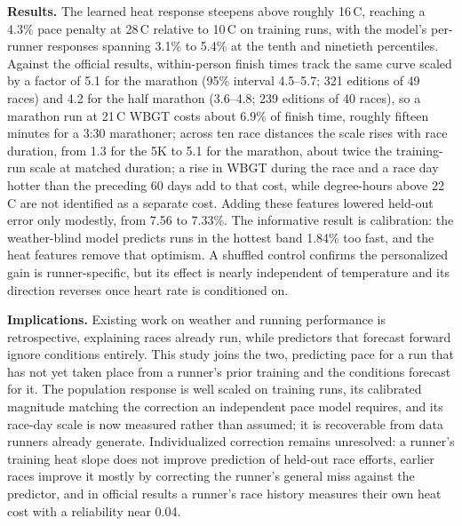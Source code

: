 \documentclass[11pt]{article}
\renewcommand{\_}{\textunderscore\allowbreak}
\begin{document}
\begin{singlespace}
\smallskip
\noindent\textbf{Results.} The learned heat response steepens above roughly 16\,\textdegree C, reaching a 4.3\% pace penalty at 28\,\textdegree C relative to 10\,\textdegree C on training runs, with the model's per-runner responses spanning 3.1\% to 5.4\% at the tenth and ninetieth percentiles. Against the official results, within-person finish times track the same curve scaled by a factor of 5.1 for the marathon (95\% interval 4.5--5.7; 321 editions of 49 races) and 4.2 for the half marathon (3.6--4.8; 239 editions of 40 races), so a marathon run at 21\,\textdegree C WBGT costs about 6.9\% of finish time, roughly fifteen minutes for a 3:30 marathoner; across ten race distances the scale rises with race duration, from 1.3 for the 5K to 5.1 for the marathon, about twice the training-run scale at matched duration; a rise in WBGT during the race and a race day hotter than the preceding 60 days add to that cost, while degree-hours above 22\,\textdegree C are not identified as a separate cost. Adding these features lowered held-out error only modestly, from 7.56 to 7.33\%. The informative result is calibration: the weather-blind model predicts runs in the hottest band 1.84\% too fast, and the heat features remove that optimism. A shuffled control confirms the personalized gain is runner-specific, but its effect is nearly independent of temperature and its direction reverses once heart rate is conditioned on.

\smallskip
\noindent\textbf{Implications.} Existing work on weather and running performance is retrospective, explaining races already run, while predictors that forecast forward ignore conditions entirely. This study joins the two, predicting pace for a run that has not yet taken place from a runner's prior training and the conditions forecast for it. The population response is well scaled on training runs, its calibrated magnitude matching the correction an independent pace model requires, and its race-day scale is now measured rather than assumed; it is recoverable from data runners already generate. Individualized correction remains unresolved: a runner's training heat slope does not improve prediction of held-out race efforts, earlier races improve it mostly by correcting the runner's general miss against the predictor, and in official results a runner's race history measures their own heat cost with a reliability near 0.04.

\end{singlespace}

\newpage
\end{document}
